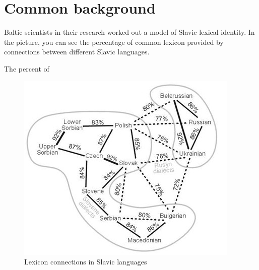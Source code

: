 \section{Common background}

Baltic scientists in their research \cite{slavic-procent} worked out a model of Slavic lexical identity. In the picture, you can see the percentage of common lexicon provided by connections between different Slavic languages.

The percent of 

\begin{figure}
	\includegraphics[width=\linewidth]{./sources/percents.jpg}
	\caption{Lexicon connections in Slavic languages}
	\label{fig:percent}
\end{figure}